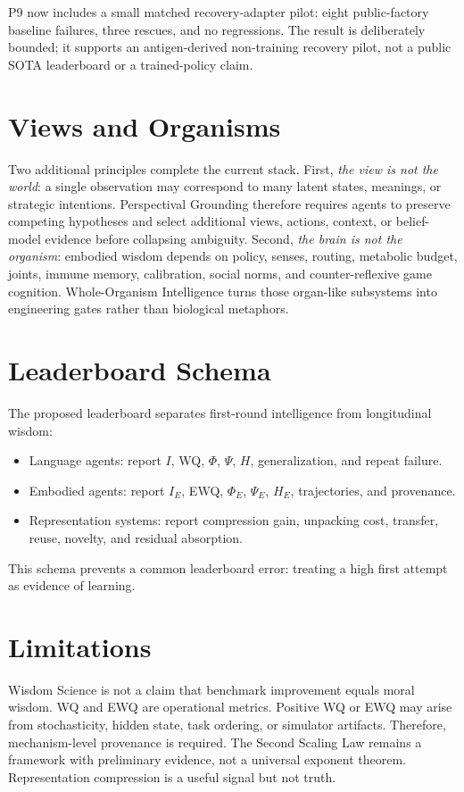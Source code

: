\documentclass[11pt]{article}
\begin{document}
P9 now includes a small matched recovery-adapter pilot: eight public-factory baseline failures, three rescues, and no regressions.
The result is deliberately bounded; it supports an antigen-derived non-training recovery pilot, not a public SOTA leaderboard or a trained-policy claim.

\section{Views and Organisms}

Two additional principles complete the current stack.
First, \emph{the view is not the world}: a single observation may correspond to many latent states, meanings, or strategic intentions.
Perspectival Grounding therefore requires agents to preserve competing hypotheses and select additional views, actions, context, or belief-model evidence before collapsing ambiguity.
Second, \emph{the brain is not the organism}: embodied wisdom depends on policy, senses, routing, metabolic budget, joints, immune memory, calibration, social norms, and counter-reflexive game cognition.
Whole-Organism Intelligence turns those organ-like subsystems into engineering gates rather than biological metaphors.

\section{Leaderboard Schema}

The proposed leaderboard separates first-round intelligence from longitudinal wisdom:
\begin{itemize}[leftmargin=*]
  \item Language agents: report $I$, WQ, $\Phi$, $\Psi$, $H$, generalization, and repeat failure.
  \item Embodied agents: report $I_E$, EWQ, $\Phi_E$, $\Psi_E$, $H_E$, trajectories, and provenance.
  \item Representation systems: report compression gain, unpacking cost, transfer, reuse, novelty, and residual absorption.
\end{itemize}

This schema prevents a common leaderboard error: treating a high first attempt as evidence of learning.

\section{Limitations}

Wisdom Science is not a claim that benchmark improvement equals moral wisdom.
WQ and EWQ are operational metrics.
Positive WQ or EWQ may arise from stochasticity, hidden state, task ordering, or simulator artifacts.
Therefore, mechanism-level provenance is required.
The Second Scaling Law remains a framework with preliminary evidence, not a universal exponent theorem.
Representation compression is a useful signal but not truth.
\end{document}
